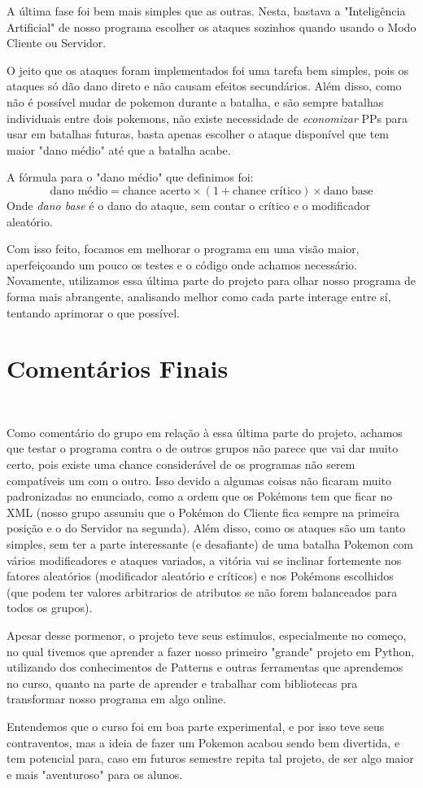 \documentclass[a4paper]{article}
\begin{document}
A última fase foi bem mais simples que as outras. Nesta, bastava a "Inteligência Artificial"
de nosso programa escolher os ataques sozinhos quando usando o Modo Cliente ou Servidor.

O jeito que os ataques foram implementados foi uma tarefa bem simples, pois os ataques só dão
dano direto e não causam efeitos secundários. Além disso, como não é possível mudar de pokemon
durante a batalha, e são sempre batalhas individuais entre dois pokemons, não existe necessidade
de \emph{economizar} PPs para usar em batalhas futuras, basta apenas escolher o ataque disponível
que tem maior "dano médio" até que a batalha acabe.

A fórmula para o "dano médio" que definimos foi:
$$ \text{dano médio} = \text{chance acerto} \times (1 + \text{chance crítico}) \times \text{dano base} $$
Onde \emph{dano base} é o dano do ataque, sem contar o crítico e o modificador aleatório.

Com isso feito, focamos em melhorar o programa em uma visão maior, aperfeiçoando um pouco
os testes e o código onde achamos necessário. Novamente, utilizamos essa última parte do
projeto para olhar nosso programa de forma mais abrangente, analisando melhor como cada parte
interage entre sí, tentando aprimorar o que possível.

\newpage
\section{Comentários Finais}

\begin{verbatim}


\end{verbatim}

Como comentário do grupo em relação à essa última parte do projeto, achamos que testar o programa
contra o de outros grupos não parece que vai dar muito certo, pois existe uma chance considerável
de os programas não serem compatíveis um com o outro. Isso devido a algumas coisas não ficaram muito
padronizadas no enunciado, como a ordem que os Pokémons tem que ficar no XML (nosso grupo assumiu
que o Pokémon do Cliente fica sempre na primeira posição e o do Servidor na segunda).
Além disso, como os ataques são um tanto simples, sem ter a parte interessante (e desafiante) de uma
batalha Pokemon com vários modificadores e ataques variados, a vitória vai se inclinar fortemente
nos fatores aleatórios (modificador aleatório e críticos) e nos Pokémons escolhidos (que podem
ter valores arbitrarios de atributos se não forem balanceados para todos os grupos).

Apesar desse pormenor, o projeto teve seus estimulos, especialmente no começo, no qual tivemos que
aprender a fazer nosso primeiro "grande" projeto em Python, utilizando dos conhecimentos de Patterns
e outras ferramentas que aprendemos no curso, quanto na parte de aprender e trabalhar com bibliotecas
pra transformar nosso programa em algo online.

Entendemos que o curso foi em boa parte experimental, e por isso teve seus contraventos, mas a ideia
de fazer um Pokemon acabou sendo bem divertida, e tem potencial para, caso em futuros semestre repita
tal projeto, de ser algo maior e mais "aventuroso" para os alunos. 
\end{document}
